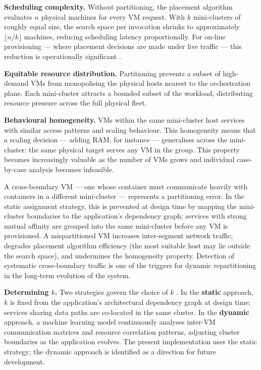 \documentclass[12pt,a4paper]{report}
\begin{document}
\textbf{Scheduling complexity.} Without partitioning, the placement algorithm
evaluates $n$ physical machines for every VM request. With $k$ mini-clusters of
roughly equal size, the search space per invocation shrinks to approximately
$\lfloor n/k \rfloor$ machines, reducing scheduling latency proportionally. For
on-line provisioning --- where placement decisions are made under live traffic --- this
reduction is operationally significant \cite{alahmad2024multiple}.

\textbf{Equitable resource distribution.} Partitioning prevents a subset of
high-demand VMs from monopolising the physical hosts nearest to the orchestration
plane. Each mini-cluster attracts a bounded subset of the workload, distributing
resource pressure across the full physical fleet.

\textbf{Behavioural homogeneity.} VMs within the same mini-cluster host services
with similar access patterns and scaling behaviour. This homogeneity means that a
scaling decision --- adding RAM, for instance --- generalises across the mini-cluster:
the same physical target serves any VM in the group. This property becomes
increasingly valuable as the number of VMs grows and individual case-by-case analysis
becomes infeasible.

A cross-boundary VM --- one whose container must communicate heavily with containers
in a different mini-cluster --- represents a partitioning error. In the static
assignment strategy, this is prevented at design time by mapping the mini-cluster
boundaries to the application's dependency graph; services with strong mutual
affinity are grouped into the same mini-cluster before any VM is provisioned. A
mispartitioned VM increases inter-segment network traffic, degrades placement
algorithm efficiency (the most suitable host may lie outside the search space), and
undermines the homogeneity property. Detection of systematic cross-boundary traffic
is one of the triggers for dynamic repartitioning in the long-term evolution of the
system.

\textbf{Determining $k$.} Two strategies govern the choice of $k$
\cite{tuli2023cilp, saxena2022proactive}. In the \textbf{static} approach, $k$ is
fixed from the application's architectural dependency graph at design time; services
sharing data paths are co-located in the same cluster. In the \textbf{dynamic}
approach, a machine learning model continuously analyses inter-VM communication
matrices and resource correlation patterns, adjusting cluster boundaries as the
application evolves. The present implementation uses the static strategy; the dynamic
approach is identified as a direction for future development.
\end{document}

